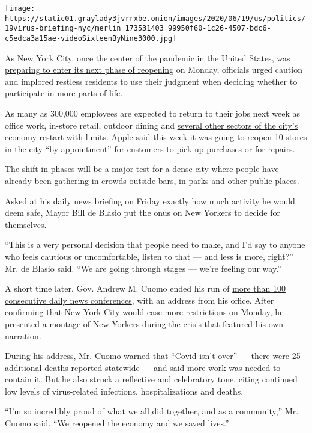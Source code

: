 \texttt{[image: https://static01.graylady3jvrrxbe.onion/images/2020/06/19/us/politics/19virus-briefing-nyc/merlin\_173531403\_99950f60-1c26-4507-bdc6-c5edca3a15ae-videoSixteenByNine3000.jpg]}

As New York City, once the center of the pandemic in the United States,
was
\href{https://www.nytimes3xbfgragh.onion/2020/06/18/nyregion/phase-2-reopening-nyc.html}{preparing
to enter its next phase of reopening} on Monday, officials urged caution
and implored restless residents to use their judgment when deciding
whether to participate in more parts of life.

As many as 300,000 employees are expected to return to their jobs next
week as office work, in-store retail, outdoor dining and
\href{https://www.nytimes3xbfgragh.onion/article/new-york-phase-reopening.html}{several
other sectors of the city's economy} restart with limits. Apple said
this week it was going to reopen 10 stores in the city ``by
appointment'' for customers to pick up purchases or for repairs.

The shift in phases will be a major test for a dense city where people
have already been gathering in crowds outside bars, in parks and other
public places.

Asked at his daily news briefing on Friday exactly how much activity he
would deem safe, Mayor Bill de Blasio put the onus on New Yorkers to
decide for themselves.

``This is a very personal decision that people need to make, and I'd say
to anyone who feels cautious or uncomfortable, listen to that --- and
less is more, right?'' Mr. de Blasio said. ``We are going through stages
--- we're feeling our way.''

A short time later, Gov. Andrew M. Cuomo ended his run of
\href{https://www.nytimes3xbfgragh.onion/2020/06/14/insider/andrew-cuomo-briefings.html}{more
than 100 consecutive daily news conferences}, with an address from his
office. After confirming that New York City would ease more restrictions
on Monday, he presented a montage of New Yorkers during the crisis that
featured his own narration.

During his address, Mr. Cuomo warned that ``Covid isn't over'' --- there
were 25 additional deaths reported statewide --- and said more work was
needed to contain it. But he also struck a reflective and celebratory
tone, citing continued low levels of virus-related infections,
hospitalizations and deaths.

``I'm so incredibly proud of what we all did together, and as a
community,'' Mr. Cuomo said. ``We reopened the economy and we saved
lives.''


